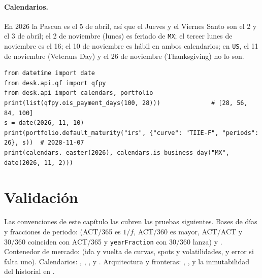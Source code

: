 \begin{sloppypar}
\paragraph{Calendarios.} En 2026 la Pascua es el 5 de abril, así que el Jueves y el Viernes Santo son el 2 y el
3 de abril; el 2 de noviembre (lunes) es feriado de \texttt{MX}; el tercer lunes de noviembre es el 16; el 10 de
noviembre es hábil en ambos calendarios; en \texttt{US}, el 11 de noviembre (Veterans Day) y el 26 de
noviembre (Thanksgiving) no lo son.

\begin{lstlisting}
from datetime import date
from desk.api.qf import qfpy
from desk.api import calendars, portfolio
print(list(qfpy.ois_payment_days(100, 28)))              # [28, 56, 84, 100]
s = date(2026, 11, 10)
print(portfolio.default_maturity("irs", {"curve": "TIIE-F", "periods": 26}, s))  # 2028-11-07
print(calendars._easter(2026), calendars.is_business_day("MX", date(2026, 11, 2)))
\end{lstlisting}

\section{Validación}\label{sec:cap01-validacion}

Las convenciones de este capítulo las cubren las pruebas siguientes. Bases de días y fracciones de periodo:
 (ACT/365 es $1/f$, ACT/360 es mayor, ACT/ACT y 30/360
coinciden con ACT/365 y \texttt{yearFraction} con 30/360 lanza) y .
Contenedor de mercado:  (ida y vuelta de curvas, spots y
volatilidades, y error si falta uno). Calendarios:
,
,
,
 y
. Arquitectura y fronteras:
,
, y la inmutabilidad del
historial en
.


\end{sloppypar}
